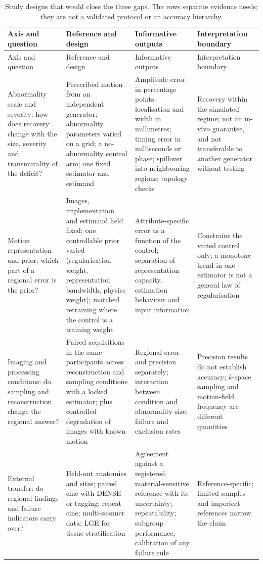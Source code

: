 \begin{longtable}{@{}L{0.18\textwidth}L{0.26\textwidth}L{0.28\textwidth}L{0.22\textwidth}@{}}
\caption{Study designs that would close the three gaps. The rows separate evidence needs; they are
not a validated protocol or an accuracy hierarchy.}\label{tab:designs}\\
\toprule
Axis and question & Reference and design & Informative outputs & Interpretation boundary\\
\midrule
\endfirsthead
\toprule
Axis and question & Reference and design & Informative outputs & Interpretation boundary\\
\midrule
\endhead
Abnormality scale and severity: how does recovery change with the size, severity and transmurality of the deficit? & Prescribed motion from an independent generator; abnormality parameters varied on a grid; a no-abnormality control arm; one fixed estimator and estimand & Amplitude error in percentage points; localisation and width in millimetres; timing error in milliseconds or phase; spillover into neighbouring regions; topology checks & Recovery within the simulated regime; not an in-vivo guarantee, and not transferable to another generator without testing\\
Motion representation and prior: which part of a regional error is the prior? & Images, implementation and estimand held fixed; one controllable prior varied (regularisation weight, representation bandwidth, physics weight); matched retraining where the control is a training weight & Attribute-specific error as a function of the control; separation of representation capacity, estimation behaviour and input information & Constrains the varied control only; a monotone trend in one estimator is not a general law of regularisation\\
Imaging and processing conditions: do sampling and reconstruction change the regional answer? & Paired acquisitions in the same participants across reconstruction and sampling conditions with a locked estimator; plus controlled degradation of images with known motion & Regional error and precision separately; interaction between condition and abnormality size; failure and exclusion rates & Precision results do not establish accuracy; $k$-space sampling and motion-field frequency are different quantities\\
External transfer: do regional findings and failure indicators carry over? & Held-out anatomies and sites; paired cine with DENSE or tagging; repeat cine; multi-scanner data; LGE for tissue stratification & Agreement against a registered material-sensitive reference with its uncertainty; repeatability; subgroup performance; calibration of any failure rule & Reference-specific; limited samples and imperfect references narrow the claim\\

\end{longtable}
